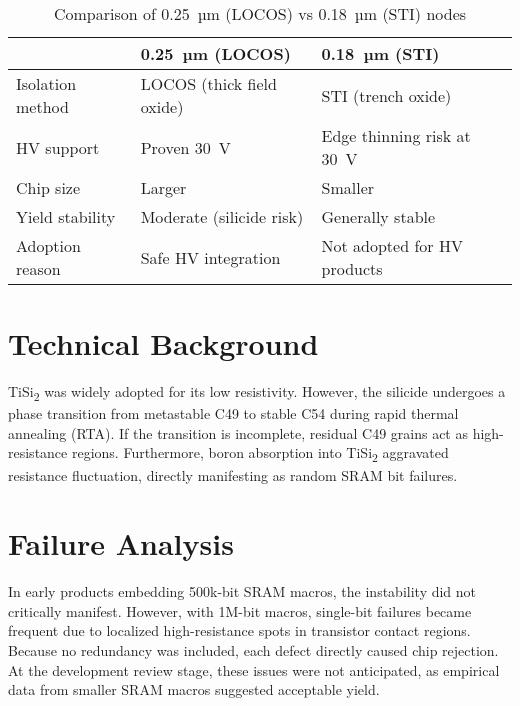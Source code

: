\documentclass[conference]{IEEEtran}
\begin{document}
\begin{table}[!t]
\centering
\caption{Comparison of 0.25~µm (LOCOS) vs 0.18~µm (STI) nodes}
\begin{tabular}{@{}lll@{}}
\toprule
 & 0.25~µm (LOCOS) & 0.18~µm (STI) \\ \midrule
Isolation method & LOCOS (thick field oxide) & STI (trench oxide) \\
HV support & Proven 30~V & Edge thinning risk at 30~V \\
Chip size & Larger & Smaller \\
Yield stability & Moderate (silicide risk) & Generally stable \\
Adoption reason & Safe HV integration & Not adopted for HV products \\ \bottomrule
\end{tabular}
\label{tab:process_comparison}
\end{table}

\section{Technical Background}
TiSi\textsubscript{2} was widely adopted for its low resistivity. 
However, the silicide undergoes a phase transition from metastable C49 to stable C54 during rapid thermal annealing (RTA). 
If the transition is incomplete, residual C49 grains act as high-resistance regions. 
Furthermore, boron absorption into TiSi\textsubscript{2} aggravated resistance fluctuation, directly manifesting as random SRAM bit failures.

\section{Failure Analysis}
In early products embedding 500k-bit SRAM macros, the instability did not critically manifest.  
However, with 1M-bit macros, single-bit failures became frequent due to localized high-resistance spots in transistor contact regions.  
Because no redundancy was included, each defect directly caused chip rejection.  
At the development review stage, these issues were not anticipated, as empirical data from smaller SRAM macros suggested acceptable yield.
\end{document}

